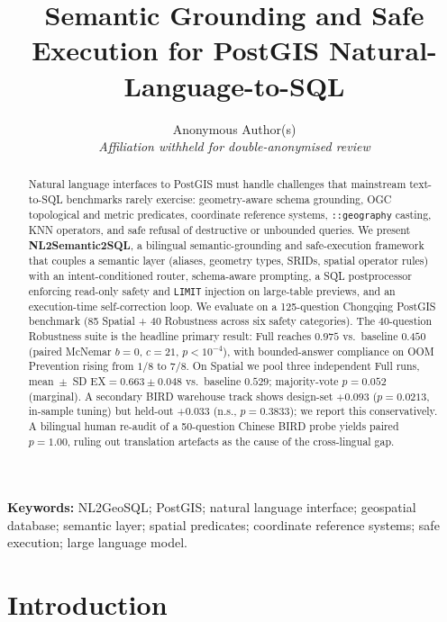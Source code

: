 \documentclass[11pt]{article}
\title{Semantic Grounding and Safe Execution for PostGIS Natural-Language-to-SQL}
\author{Anonymous Author(s)\\ \textit{Affiliation withheld for double-anonymised review}}
\date{}
\begin{document}
\maketitle

\begin{abstract}
Natural language interfaces to PostGIS must handle challenges that mainstream text-to-SQL benchmarks rarely exercise: geometry-aware schema grounding, OGC topological and metric predicates, coordinate reference systems, \texttt{::geography} casting, KNN operators, and safe refusal of destructive or unbounded queries. We present \textbf{NL2Semantic2SQL}, a bilingual semantic-grounding and safe-execution framework that couples a semantic layer (aliases, geometry types, SRIDs, spatial operator rules) with an intent-conditioned router, schema-aware prompting, a SQL postprocessor enforcing read-only safety and \texttt{LIMIT} injection on large-table previews, and an execution-time self-correction loop. We evaluate on a 125-question Chongqing PostGIS benchmark (85 Spatial + 40 Robustness across six safety categories). The 40-question Robustness suite is the headline primary result: Full reaches $0.975$ vs.\ baseline $0.450$ (paired McNemar $b=0$, $c=21$, $p<10^{-4}$), with bounded-answer compliance on OOM Prevention rising from $1/8$ to $7/8$. On Spatial we pool three independent Full runs, mean~$\pm$~SD EX$=0.663 \pm 0.048$ vs.\ baseline $0.529$; majority-vote $p=0.052$ (marginal). A secondary BIRD warehouse track shows design-set $+0.093$ ($p=0.0213$, in-sample tuning) but held-out $+0.033$ (n.s., $p=0.3833$); we report this conservatively. A bilingual human re-audit of a 50-question Chinese BIRD probe yields paired $p=1.00$, ruling out translation artefacts as the cause of the cross-lingual gap.
\end{abstract}

\noindent\textbf{Keywords:} NL2GeoSQL; PostGIS; natural language interface; geospatial database; semantic layer; spatial predicates; coordinate reference systems; safe execution; large language model.

\section{Introduction}
\label{sec:intro}
\end{document}

